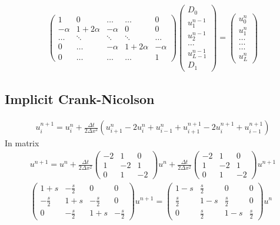 \documentclass[11pt,a4paper,draft]{article}
\numberwithin{equation}{section}
\begin{document}
\begin{align*}
\begin{pmatrix} 1 & 0 & \dots   & \dots         & 0 \\
                -\alpha & 1+2\alpha & -\alpha & 0           &0 \\
        \dots  & \ddots & \ddots & \ddots         & \dots\\
 0   & \dots &  -\alpha & 1+2\alpha & -\alpha \\
 0   & \dots & \dots & \dots    &  1
             \end{pmatrix}
\begin{pmatrix} D_0 \\
      u_1^{n-1} \\
      u_2^{n-1}\\ \dots\\ u_{L-1}^{n-1}\\
      D_1
\end{pmatrix} 
=  \begin{pmatrix} u_0^n \\
                   u_1^n  \\
           \dots\\ \dots\\ \dots\\
                   u_L^n 
             \end{pmatrix} 
\end{align*} 

\subsection{Implicit Crank-Nicolson}
\begin{gather}
u_i^{n+1} = u_i^n + \frac{\Delta t}{2\Delta x^2}\left(
u_{i+1}^n - 2u_i^n + u_{i-1}^n + u_{i+1}^{n+1} - 2u_i^{n+1} + u_{i-1}^{n+1}
\right)
\end{gather}
In matrix
\begin{gather}
u^{n+1} = u^n + \frac{\Delta t}{2\Delta x^2}
\begin{pmatrix}
-2 & 1 & 0\\
1 & -2 & 1\\
0 & 1 & -2
\end{pmatrix} u^n
 + \frac{\Delta t}{2\Delta x^2}
\begin{pmatrix}
-2 & 1 & 0\\
1 & -2 & 1\\
0 & 1 & -2
\end{pmatrix}u^{n+1}\\
\begin{pmatrix}
1 + s & -\frac{s}{2} & 0 & 0\\
-\frac{s}{2} & 1 + s & -\frac{s}{2} & 0\\
0 & -\frac{s}{2} & 1 + s & -\frac{s}{2}
\end{pmatrix}
u^{n+1} = 
\begin{pmatrix}
1 - s & \frac{s}{2} & 0 & 0\\
\frac{s}{2} & 1 - s & \frac{s}{2} &  0\\
0 & \frac{s}{2} & 1 - s & \frac{s}{2}
\end{pmatrix}u^n
\end{gather}
\end{document}
